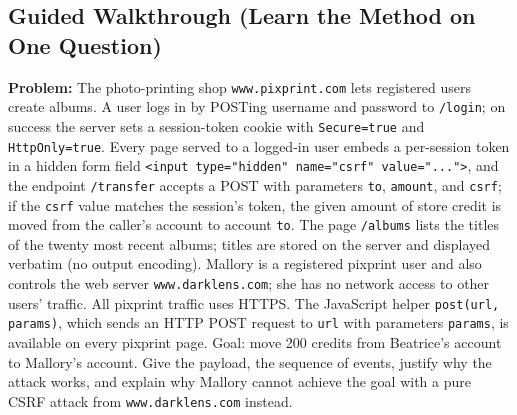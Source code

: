 \documentclass[12pt, a4paper]{article}
\begin{document}
\subsection*{Guided Walkthrough (Learn the Method on One Question)}
\textbf{Problem:} The photo-printing shop \texttt{www.pixprint.com} lets registered users create albums. A user logs in by POSTing username and password to \texttt{/login}; on success the server sets a session-token cookie with \texttt{Secure=true} and \texttt{HttpOnly=true}. Every page served to a logged-in user embeds a per-session token in a hidden form field \texttt{<input type="hidden" name="csrf" value="...">}, and the endpoint \texttt{/transfer} accepts a POST with parameters \texttt{to}, \texttt{amount}, and \texttt{csrf}; if the \texttt{csrf} value matches the session's token, the given amount of store credit is moved from the caller's account to account \texttt{to}. The page \texttt{/albums} lists the titles of the twenty most recent albums; titles are stored on the server and displayed verbatim (no output encoding). Mallory is a registered pixprint user and also controls the web server \texttt{www.darklens.com}; she has no network access to other users' traffic. All pixprint traffic uses HTTPS. The JavaScript helper \texttt{post(url, params)}, which sends an HTTP POST request to \texttt{url} with parameters \texttt{params}, is available on every pixprint page. Goal: move 200 credits from Beatrice's account to Mallory's account. Give the payload, the sequence of events, justify why the attack works, and explain why Mallory cannot achieve the goal with a pure CSRF attack from \texttt{www.darklens.com} instead.
\end{document}
